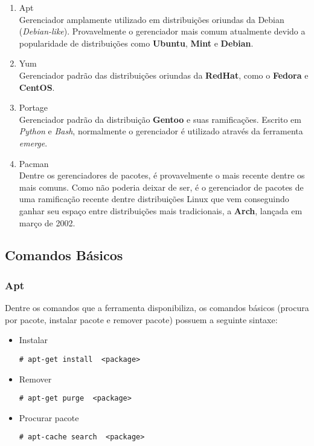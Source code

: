 \begin{enumerate}
	\item Apt\\
		Gerenciador amplamente utilizado em distribuições oriundas da Debian (\textit{Debian-like}). Provavelmente o gerenciador mais comum atualmente devido a popularidade de distribuições como \textbf{Ubuntu}, \textbf{Mint} e \textbf{Debian}.
	\item Yum\\
		Gerenciador padrão  das distribuições oriundas da \textbf{RedHat}, como o \textbf{Fedora} e \textbf{CentOS}.
	\item Portage\\
		Gerenciador padrão da distribuição \textbf{Gentoo} e suas ramificações. Escrito em \textit{Python} e \textit{Bash}, normalmente o gerenciador é utilizado através da ferramenta \textit{emerge}.
	\item Pacman\\
		Dentre os gerenciadores de pacotes, é provavelmente o mais recente dentre os mais comuns. Como não poderia deixar de ser, é  o gerenciador de pacotes de uma ramificação recente dentre distribuições Linux que vem conseguindo ganhar seu espaço entre distribuições mais tradicionais, a \textbf{Arch}, lançada em março de 2002.
\end{enumerate}

\subsection{Comandos Básicos} %
\label{sec:comandos_b_sicos}


\subsubsection{Apt} %
\label{sub:apt}

Dentre os comandos que a ferramenta disponibiliza, os comandos básicos (procura por pacote, instalar pacote e remover pacote) possuem a seguinte sintaxe:

\begin{itemize}
	\item Instalar
	\begin{lstlisting}[numbers=none,commentstyle=\color{black}]
	# apt-get install  <package>
	\end{lstlisting}
	\item Remover
	\begin{lstlisting}[numbers=none,commentstyle=\color{black}]
	# apt-get purge  <package>
	\end{lstlisting}
	\item Procurar pacote
	\begin{lstlisting}[numbers=none,commentstyle=\color{black}]
	# apt-cache search  <package>
	\end{lstlisting}
\end{itemize}



